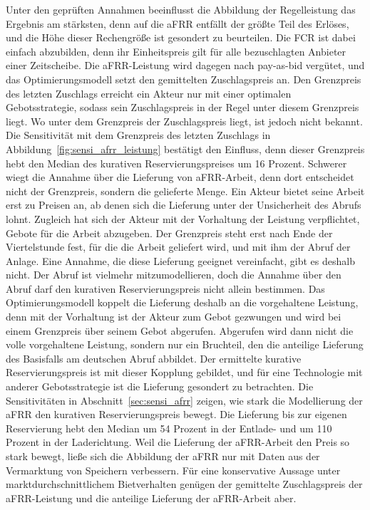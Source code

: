 Unter den geprüften Annahmen beeinflusst die Abbildung der Regelleistung das Ergebnis am stärksten, denn auf die \ac{aFRR} entfällt der größte Teil des Erlöses, und die Höhe dieser Rechengröße ist gesondert zu beurteilen.
Die \ac{FCR} ist dabei einfach abzubilden, denn ihr Einheitspreis gilt für alle bezuschlagten Anbieter einer Zeitscheibe.
Die \ac{aFRR}-Leistung wird dagegen nach pay-as-bid vergütet, und das Optimierungsmodell setzt den gemittelten Zuschlagspreis an.
Den Grenzpreis des letzten Zuschlags erreicht ein Akteur nur mit einer optimalen Gebotsstrategie, sodass sein Zuschlagspreis in der Regel unter diesem Grenzpreis liegt.
Wo unter dem Grenzpreis der Zuschlagspreis liegt, ist jedoch nicht bekannt.
Die Sensitivität mit dem Grenzpreis des letzten Zuschlags in Abbildung~\ref{fig:sensi_afrr_leistung} bestätigt den Einfluss, denn dieser Grenzpreis hebt den Median des kurativen Reservierungspreises um 16 Prozent.
Schwerer wiegt die Annahme über die Lieferung von \ac{aFRR}-Arbeit, denn dort entscheidet nicht der Grenzpreis, sondern die gelieferte Menge.
Ein Akteur bietet seine Arbeit erst zu Preisen an, ab denen sich die Lieferung unter der Unsicherheit des Abrufs lohnt.
Zugleich hat sich der Akteur mit der Vorhaltung der Leistung verpflichtet, Gebote für die Arbeit abzugeben.
Der Grenzpreis steht erst nach Ende der Viertelstunde fest, für die die Arbeit geliefert wird, und mit ihm der Abruf der Anlage.
Eine Annahme, die diese Lieferung geeignet vereinfacht, gibt es deshalb nicht.
Der Abruf ist vielmehr mitzumodellieren, doch die Annahme über den Abruf darf den kurativen Reservierungspreis nicht allein bestimmen.
Das Optimierungsmodell koppelt die Lieferung deshalb an die vorgehaltene Leistung, denn mit der Vorhaltung ist der Akteur zum Gebot gezwungen und wird bei einem Grenzpreis über seinem Gebot abgerufen.
Abgerufen wird dann nicht die volle vorgehaltene Leistung, sondern nur ein Bruchteil, den die anteilige Lieferung des Basisfalls am deutschen Abruf abbildet.
Der ermittelte kurative Reservierungspreis ist mit dieser Kopplung gebildet, und für eine Technologie mit anderer Gebotsstrategie ist die Lieferung gesondert zu betrachten.
Die Sensitivitäten in Abschnitt~\ref{sec:sensi_afrr} zeigen, wie stark die Modellierung der \ac{aFRR} den kurativen Reservierungspreis bewegt.
Die Lieferung bis zur eigenen Reservierung hebt den Median um 54 Prozent in der Entlade- und um 110 Prozent in der Laderichtung.
Weil die Lieferung der \ac{aFRR}-Arbeit den Preis so stark bewegt, ließe sich die Abbildung der \ac{aFRR} nur mit Daten aus der Vermarktung von Speichern verbessern.
Für eine konservative Aussage unter marktdurchschnittlichem Bietverhalten genügen der gemittelte Zuschlagspreis der \ac{aFRR}-Leistung und die anteilige Lieferung der \ac{aFRR}-Arbeit aber.

